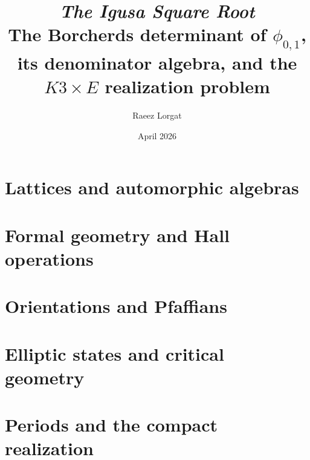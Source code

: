 \documentclass[11pt,oldfontcommands]{memoir}
\title{\texorpdfstring{\textit{The Igusa Square Root}\\[0.5em]\small The Borcherds determinant of \(\phi_{0,1}\), its denominator algebra, and the \(K3\times E\) realization problem}{The Igusa Square Root: The Borcherds determinant of phi\_0,1, its denominator algebra, and the K3 x E realization problem}}
\author{Raeez Lorgat}
\date{April 2026}
\begin{document}
\maketitle



\bigskip
\tableofcontents

\part{Lattices and automorphic algebras}






\part{Formal geometry and Hall operations}



\part{Orientations and Pfaffians}



\part{Elliptic states and critical geometry}








\part{Periods and the compact realization}




\clearpage
\appendix
{}











\clearpage
{}


\end{document}
